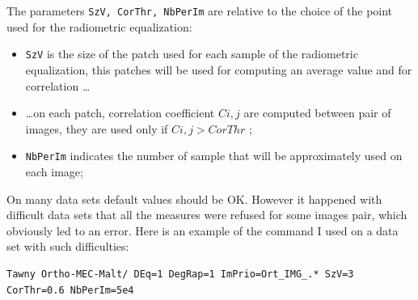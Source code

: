 The parameters {\tt SzV, CorThr, NbPerIm} are relative to the choice of the point
used for the radiometric equalization:


\begin{itemize}
   \item {\tt SzV} is the size of the patch used for each sample of the radiometric equalization,
	 this patches will be used for computing an average value and for correlation  \dots

   \item  \dots on each patch, correlation coefficient  $C{i,j}$ are computed between pair
	  of images, they are used only if  $C{i,j} > CorThr$ ;

   \item {\tt NbPerIm} indicates the number of sample that will be approximately used on each image;

\end{itemize}


On many data sets default values should be OK. However it happened with difficult data
sets that all the measures were refused for some images pair, which obviously led to an error.
Here is an example of the command I used on a data set with such difficulties:


\begin{verbatim}
Tawny Ortho-MEC-Malt/ DEq=1 DegRap=1 ImPrio=Ort_IMG_.* SzV=3 CorThr=0.6 NbPerIm=5e4
\end{verbatim}


